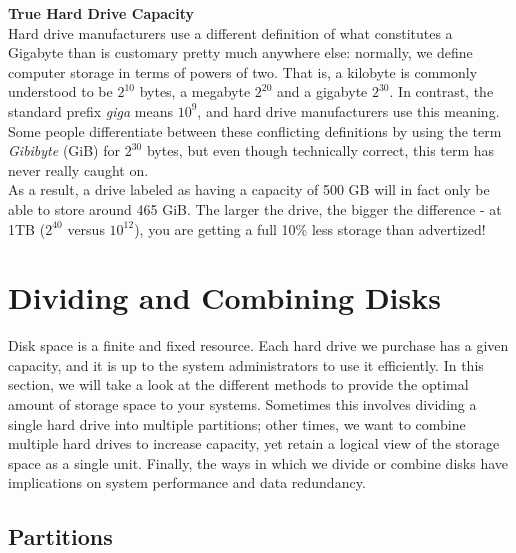\begin{sidenote}
{\bf True Hard Drive Capacity} \\
Hard drive manufacturers use a different definition of
what constitutes a Gigabyte than is customary pretty
much anywhere else: normally, we define computer
storage in terms of powers of two.  That is, a
kilobyte is commonly understood to be $2^{10}$ bytes,
a megabyte $2^{20}$ and a gigabyte $2^{30}$.  In
contrast, the standard prefix {\em giga} means $10^9$,
and hard drive manufacturers use this meaning.  Some
people differentiate between these conflicting
definitions by using the term {\em Gibibyte} (GiB) for
$2^{30}$ bytes, but even though technically correct,
this term has never really caught on. \\[10pt] As a
result, a drive labeled as having a capacity of 500 GB
will in fact only be able to store around 465 GiB.
The larger the drive, the bigger the difference - at
1TB ($2^{40}$ versus $10^{12}$), you are getting a
full 10\% less storage than advertized!
\end{sidenote}

\section{Dividing and Combining Disks}
\label{file systems:storage-models:dividing-and-combining-disks}

Disk space is a finite and fixed resource.  Each hard
drive we purchase has a given capacity, and it is up
to the system administrators to use it efficiently.
In this section, we will take a look at the
different methods to provide the optimal amount of
storage space to your systems.  Sometimes this
involves dividing a single hard drive into multiple
partitions; other times, we want to combine multiple
hard drives to increase capacity, yet retain a logical
view of the storage space as a single unit.  Finally,
the ways in which we divide or combine disks have
implications on system performance and data
redundancy.



\subsection{Partitions}
\label{file systems:storage-models:dividing-and-combining-disks:partitions}

